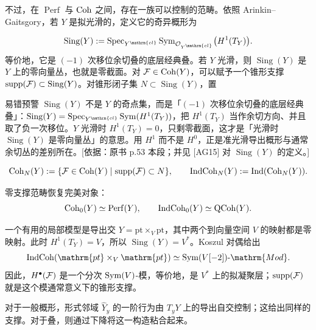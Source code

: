 不过，在 $\operatorname{Perf}$ 与 $\operatorname{Coh}$ 之间，存在一族可以控制的范畴。依照 Arinkin–Gaitsgory\cite{AG15}，若 $Y$ 是拟光滑的，定义它的奇异概形为
\begin{definition*}{}
\[\operatorname{Sing}(Y):=\Spec_{Y^{\mathrm{cl}}}\Sym_{\cO_{Y^{\mathrm{cl}}}}\bigl(H^1(T_Y)\bigr).\]
等价地，它是 $(-1)$ 次移位余切叠的底层经典叠。若 $Y$ 光滑，则 $\operatorname{Sing}(Y)$ 是 $Y$ 上的零向量丛，也就是零截面。对 $\mathcal{F}\in\operatorname{Coh}(Y)$，可以赋予一个锥形支撑 $\operatorname{supp}(\mathcal{F})\subset\operatorname{Sing}(Y)$。对锥形闭子集 $N\subset\operatorname{Sing}(Y)$，置

\begin{transnote}{易错预警}
$\operatorname{Sing}(Y)$ 不是 $Y$ 的奇点集，而是「$(-1)$ 次移位余切叠的底层经典叠」：$\operatorname{Sing}(Y)=\Spec_{Y^{\mathrm{cl}}}\Sym(H^1(T_Y))$，把 $H^1(T_Y)$ 当作余切方向、并且取了负一次移位。$Y$ 光滑时 $H^1(T_Y)=0$，只剩零截面，这才是「光滑时 $\operatorname{Sing}(Y)$ 是零向量丛」的意思。用 $H^1$ 而不是 $H^0$，正是准光滑导出概形与通常余切丛的差别所在。[依据：原书 p.53 本段；并见 [AG15] 对 $\operatorname{Sing}(Y)$ 的定义。]
\end{transnote}
\[\operatorname{Coh}_N(Y):=\{\mathcal{F}\in\operatorname{Coh}(Y)\mid\operatorname{supp}(\mathcal{F})\subset N\},\qquad
\operatorname{IndCoh}_N(Y):=\operatorname{Ind}(\operatorname{Coh}_N(Y)).\]
\end{definition*}
零支撑范畴恢复完美对象：
\[\operatorname{Coh}_0(Y)\simeq\operatorname{Perf}(Y),\qquad\operatorname{IndCoh}_0(Y)\simeq\operatorname{QCoh}(Y).\]
\begin{example}
一个有用的局部模型是导出交 $Y=\mathrm{pt}\times_V\mathrm{pt}$，其中两个到向量空间 $V$ 的映射都是零映射。此时 $H^1(T_Y)=V$，所以 $\operatorname{Sing}(Y)=V^*$。Koszul 对偶给出
\[\IndCoh(\mathrm{pt}\times_V\mathrm{pt})\simeq\Sym(V[-2])\text{-}\mathrm{Mod}.\]
因此，$H^\bullet(\mathcal{F})$ 是一个分次 $\operatorname{Sym}(V)$-模，等价地，是 $V^*$ 上的拟凝聚层；$\operatorname{supp}(\mathcal{F})$ 就是这个模通常意义下的锥形支撑。
\end{example}
对于一般概形，形式邻域 $\widehat Y_y$ 的一阶行为由 $T_yY$ 上的导出自交控制；这给出同样的支撑。对于叠，则通过下降将这一构造粘合起来。

